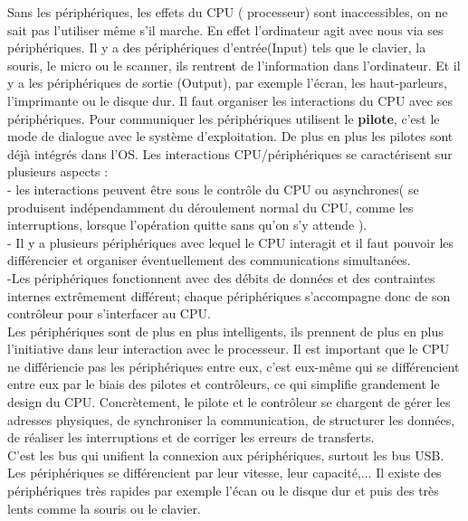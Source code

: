 \documentclass{report}
\begin{document}
Sans les périphériques, les effets du CPU ( processeur) sont inaccessibles, on ne sait pas l'utiliser même s'il marche. En effet l'ordinateur agit avec nous via ses périphériques. Il y a des périphériques d'entrée(Input) tels que le clavier, la souris, le micro ou le scanner, ils rentrent de l'information dans l'ordinateur. Et il y a les périphériques de sortie (Output), par exemple l'écran, les haut-parleurs, l'imprimante ou le disque dur. Il faut organiser les interactions du CPU avec ses périphériques. Pour communiquer les périphériques utilisent le {\bf pilote}, c'est le mode de dialogue avec le système d'exploitation. De plus en plus les pilotes sont déjà intégrés dans l'OS. Les interactions CPU/périphériques se caractérisent sur plusieurs aspects :\\
- les interactions peuvent être sous le contrôle du CPU ou asynchrones( se produisent indépendamment du déroulement normal du CPU, comme les interruptions, lorsque l'opération quitte sans qu'on s'y attende ). \\
- Il y a plusieurs périphériques avec lequel le CPU interagit et il faut pouvoir les différencier et organiser éventuellement des communications simultanées.\\
-Les périphériques fonctionnent avec des débits de données et des contraintes internes extrêmement différent; chaque périphériques s'accompagne donc de son contrôleur pour s'interfacer au CPU.\\

Les périphériques sont de plus en plus intelligents, ils prennent de plus en plus l'initiative dans leur interaction avec le processeur.
Il est important que le CPU ne différiencie pas les périphériques entre eux, c'est eux-même qui se différencient entre eux par le biais des pilotes et contrôleurs, ce qui simplifie grandement le design du CPU. Concrètement, le pilote et le contrôleur se chargent de gérer les adresses physiques, de synchroniser la communication, de structurer les données, de réaliser les interruptions et de corriger les erreurs de transferts.\\
C'est les bus qui unifient la connexion aux périphériques, surtout les bus USB.
Les périphériques se différencient par leur vitesse, leur capacité,...
Il existe des périphériques très rapides par exemple l'écan ou le disque dur et puis des très lents comme la souris ou le clavier.
\end{document}
